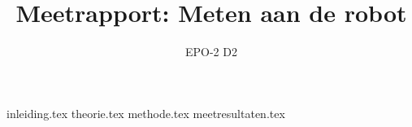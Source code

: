 \documentclass{report}
\title{Meetrapport: Meten aan de robot}
\author{EPO-2 D2}
\begin{document}
\maketitle
\newpage
{}
\tableofcontents
{inleiding.tex}
\newpage
{}
{theorie.tex}
{methode.tex}
{meetresultaten.tex}
\newpage
{}
\printbibliography
\end{document}
